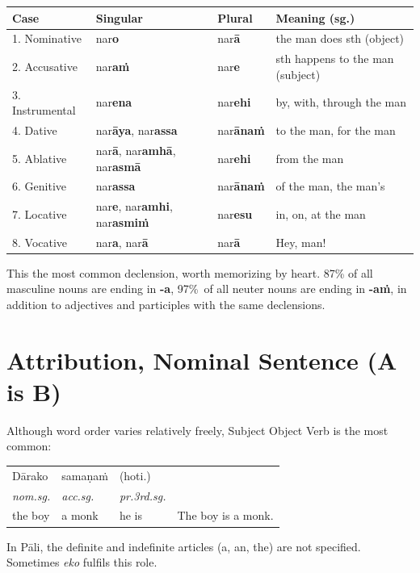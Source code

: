 \documentclass[11pt,oneside]{memoir}
\begin{document}
\begin{center}
\begin{tabular}{llll}
Case & Singular & Plural & Meaning (sg.)\\
\hline
1. Nominative & nar\textbf{o} & nar\textbf{ā} & the man does sth (object)\\
2. Accusative & nar\textbf{aṁ} & nar\textbf{e} & sth happens to the man (subject)\\
3. Instrumental & nar\textbf{ena} & nar\textbf{ehi} & by, with, through the man\\
4. Dative & nar\textbf{āya}, nar\textbf{assa} & nar\textbf{ānaṁ} & to the man, for the man\\
5. Ablative & nar\textbf{ā}, nar\textbf{amhā}, nar\textbf{asmā} & nar\textbf{ehi} & from the man\\
6. Genitive & nar\textbf{assa} & nar\textbf{ānaṁ} & of the man, the man's\\
7. Locative & nar\textbf{e}, nar\textbf{amhi}, nar\textbf{asmiṁ} & nar\textbf{esu} & in, on, at the man\\
8. Vocative & nar\textbf{a}, nar\textbf{ā} & nar\textbf{ā} & Hey, man!\\
\end{tabular}
\end{center}

This the most common declension, worth memorizing by heart. 87\% of all masculine
nouns are ending in \textbf{-a}, \mbox{97\% of} all neuter nouns are ending in \textbf{-aṁ}, in
addition to adjectives and participles with the same declensions.
\section{Attribution, Nominal Sentence (A is B)}
\label{sec:org8d1da7e}

Although word order varies relatively freely, Subject Object Verb is the most common:

\begin{center}
\begin{tabular}{llll}
Dārako & samaṇaṁ & (hoti.) & \\
\emph{nom.sg.} & \emph{acc.sg.} & \emph{pr.3rd.sg.} & \\
the boy & a monk & he is & The boy is a monk.\\
\end{tabular}
\end{center}

In Pāli, the definite and indefinite articles (a, an, the) are not specified. Sometimes \emph{eko} fulfils this role.
\end{document}
